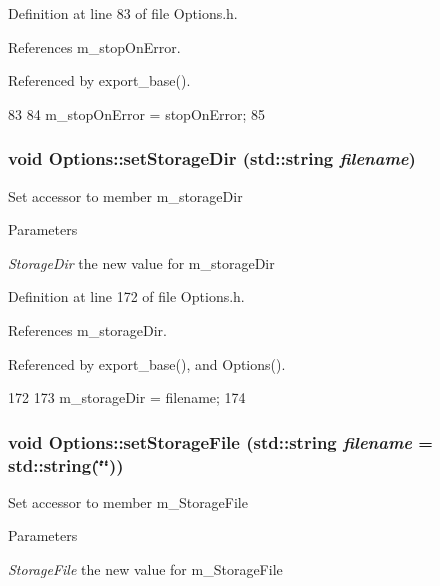 Definition at line 83 of file Options.h.

References m\_\-stopOnError.

Referenced by export\_\-base().


\begin{DoxyCode}
83                                                {
84                 m_stopOnError = stopOnError;
85         }
\end{DoxyCode}
\hypertarget{classOptions_aed5e6919526bcfa5cf4961230bd20e37}{
\subsubsection[{setStorageDir}]{\setlength{\rightskip}{0pt plus 5cm}void Options::setStorageDir (std::string {\em filename})}}
\label{classOptions_aed5e6919526bcfa5cf4961230bd20e37}
Set accessor to member m\_\-storageDir 
\begin{DoxyParams}{Parameters}
\item[{\em StorageDir}]the new value for m\_\-storageDir \end{DoxyParams}


Definition at line 172 of file Options.h.

References m\_\-storageDir.

Referenced by export\_\-base(), and Options().


\begin{DoxyCode}
172                                                {
173                 m_storageDir = filename;
174         }
\end{DoxyCode}
\hypertarget{classOptions_ac163281337998af5ca3b7a9617337fef}{
\subsubsection[{setStorageFile}]{\setlength{\rightskip}{0pt plus 5cm}void Options::setStorageFile (std::string {\em filename} = {\ttfamily std::string(\char`\"{}\char`\"{})})}}
\label{classOptions_ac163281337998af5ca3b7a9617337fef}
Set accessor to member m\_\-StorageFile 
\begin{DoxyParams}{Parameters}
\item[{\em StorageFile}]the new value for m\_\-StorageFile \end{DoxyParams}


